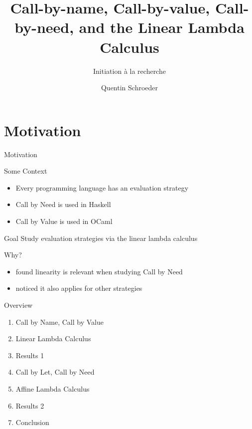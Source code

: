 \documentclass[10pt]{beamer}
\title{Call-by-name, Call-by-value, Call-by-need, and the Linear Lambda Calculus }
\subtitle{Initiation à la recherche}
\date{}
\author{Quentin Schroeder}
\institute{MPRI - Université Paris-Cité}
\begin{document}
\maketitle


\section[Idea]{Motivation}

\begin{frame}[fragile]{Motivation}
  \begin{alertblock}{Some Context}
    \begin{itemize}
      \item Every programming language has an evaluation strategy
      \item Call by Need is used in Haskell
      \item Call by Value is used in OCaml
    \end{itemize}

  \end{alertblock}

  \begin{alertblock}{Goal}
    Study evaluation strategies via the linear lambda calculus
  \end{alertblock}

  \begin{alertblock}{Why?}
    \begin{itemize}
      \item found linearity is relevant when studying Call by Need
      \item noticed it also applies for other strategies
    \end{itemize}
  \end{alertblock}
\end{frame}

\begin{frame}[fragile]{Overview}
  \begin{enumerate}
    \item Call by Name, Call by Value
    \item Linear Lambda Calculus
    \item Results 1
    \item Call by Let, Call by Need
    \item Affine Lambda Calculus
    \item Results 2
    \item Conclusion
  \end{enumerate}

\end{frame}
\end{document}

